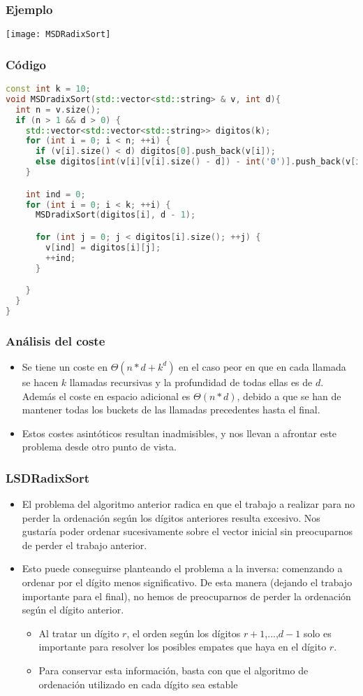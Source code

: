 \documentclass{beamer}
\begin{document}
\begin{frame}
\frametitle{Ejemplo}
\texttt{[image: MSDRadixSort]}
\end{frame}

\begin{frame}[fragile]
\frametitle{Código}
 \begin{lstlisting}[language = C++, basicstyle=\ttfamily\scriptsize]
const int k = 10;
void MSDradixSort(std::vector<std::string> & v, int d){
  int n = v.size();
  if (n > 1 && d > 0) {
    std::vector<std::vector<std::string>> digitos(k);
    for (int i = 0; i < n; ++i) {
      if (v[i].size() < d) digitos[0].push_back(v[i]);
      else digitos[int(v[i][v[i].size() - d]) - int('0')].push_back(v[i]);
    }

    int ind = 0;
    for (int i = 0; i < k; ++i) {
      MSDradixSort(digitos[i], d - 1); 

      for (int j = 0; j < digitos[i].size(); ++j) {
        v[ind] = digitos[i][j];
        ++ind;
      }

    }
  }
}
\end{lstlisting}
\end{frame}

\begin{frame}
\frametitle{Análisis del coste}
\begin{itemize}
	\item Se tiene un coste en $\Theta(n*d+k^d)$ en el caso peor en que en cada llamada se hacen $k$ llamadas recursivas y la profundidad de todas ellas es de $d$. Además el coste en espacio adicional es $\Theta(n*d)$, debido a que se han de mantener todas los buckets de las llamadas precedentes hasta el final.
	\item Estos costes asintóticos resultan inadmisibles, y nos llevan a afrontar este problema desde otro punto de vista.
\end{itemize}
\end{frame}

\begin{frame}
\frametitle{LSDRadixSort}
\begin{itemize}
	\item El problema del algoritmo anterior radica en que el trabajo a realizar para no perder la ordenación según los dígitos anteriores resulta excesivo. Nos gustaría poder ordenar sucesivamente sobre el vector inicial sin preocuparnos de perder el trabajo anterior.
	\item Esto puede conseguirse planteando el problema a la inversa: comenzando a ordenar por el dígito menos significativo. De esta manera (dejando el trabajo importante para el final), no hemos de preocuparnos de perder la ordenación según el dígito anterior.
	\begin{itemize}
		\item Al tratar un dígito $r$, el orden según los dígitos $r+1$,...,$d-1$ solo es importante para resolver los posibles empates que haya en el dígito $r$.
		\item Para conservar esta información, basta con que el algoritmo de ordenación utilizado en cada dígito sea estable
	\end{itemize}
\end{itemize}
\end{frame}
\end{document}
